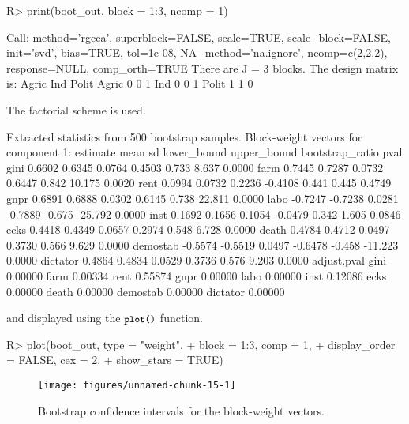 \documentclass[
]{jss}
\begin{document}
\begin{CodeChunk}
\begin{CodeInput}
R> print(boot_out, block = 1:3, ncomp = 1)
\end{CodeInput}
\begin{CodeOutput}
Call: method='rgcca', superblock=FALSE, scale=TRUE, scale_block=FALSE, init='svd',
bias=TRUE, tol=1e-08, NA_method='na.ignore', ncomp=c(2,2,2), response=NULL,
comp_orth=TRUE 
There are J = 3 blocks.
The design matrix is:
      Agric Ind Polit
Agric     0   0     1
Ind       0   0     1
Polit     1   1     0

The factorial scheme is used.

Extracted statistics from 500 bootstrap samples.
Block-weight vectors for component 1: 
         estimate    mean     sd lower_bound upper_bound bootstrap_ratio   pval
gini       0.6602  0.6345 0.0764      0.4503       0.733           8.637 0.0000
farm       0.7445  0.7287 0.0732      0.6447       0.842          10.175 0.0020
rent       0.0994  0.0732 0.2236     -0.4108       0.441           0.445 0.4749
gnpr       0.6891  0.6888 0.0302      0.6145       0.738          22.811 0.0000
labo      -0.7247 -0.7238 0.0281     -0.7889      -0.675         -25.792 0.0000
inst       0.1692  0.1656 0.1054     -0.0479       0.342           1.605 0.0846
ecks       0.4418  0.4349 0.0657      0.2974       0.548           6.728 0.0000
death      0.4784  0.4712 0.0497      0.3730       0.566           9.629 0.0000
demostab  -0.5574 -0.5519 0.0497     -0.6478      -0.458         -11.223 0.0000
dictator   0.4864  0.4834 0.0529      0.3736       0.576           9.203 0.0000
         adjust.pval
gini         0.00000
farm         0.00334
rent         0.55874
gnpr         0.00000
labo         0.00000
inst         0.12086
ecks         0.00000
death        0.00000
demostab     0.00000
dictator     0.00000
\end{CodeOutput}
\end{CodeChunk}

\normalsize

and displayed using the \(\small{\texttt{plot()}}\) function.

\footnotesize

\begin{CodeChunk}
\begin{CodeInput}
R> plot(boot_out, type = "weight", 
+      block = 1:3, comp = 1, 
+      display_order = FALSE, cex = 2,
+      show_stars = TRUE)
\end{CodeInput}
\begin{figure}[H]

{\centering \texttt{[image: figures/unnamed-chunk-15-1]} 

}

\caption[Bootstrap confidence intervals for the block-weight vectors]{Bootstrap confidence intervals for the block-weight vectors.}\label{fig:unnamed-chunk-15}
\end{figure}
\end{CodeChunk}
\end{document}

